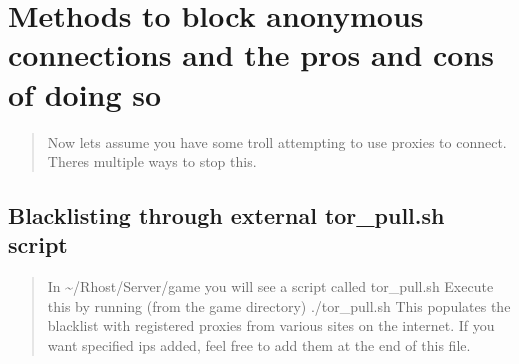 \documentclass[letterpaper,10pt,english]{sphinxmanual}
\begin{document}
\begin{sphinxVerbatim}[commandchars=\\\{\}]
           
         
             
           
          
            
          
          
\end{sphinxVerbatim}


\section{Methods to block anonymous connections and the pros and cons of doing so}
\label{\detokenize{security:methods-to-block-anonymous-connections-and-the-pros-and-cons-of-doing-so}}\begin{quote}

\sphinxAtStartPar
Now let\textquotesingle{}s assume you have some troll attempting to use proxies to connect.
There\textquotesingle{}s multiple ways to stop this.
\end{quote}


\subsection{Blacklisting through external tor\_pull.sh script}
\label{\detokenize{security:blacklisting-through-external-tor-pull-sh-script}}\begin{quote}

\sphinxAtStartPar
In \textasciitilde{}/Rhost/Server/game you will see a script called tor\_pull.sh
Execute this by running (from the game directory) ./tor\_pull.sh
This populates the blacklist with registered proxies from various sites
on the internet.  If you want specified ip\textquotesingle{}s added, feel free to add
them at the end of this file.
\end{quote}
\end{document}
